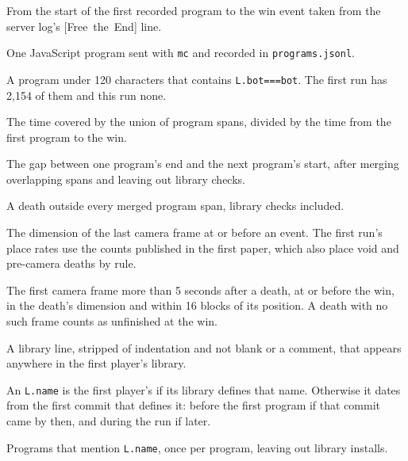 \documentclass[11pt,a4paper]{article}
\newcommand{\adv}[1]{\mbox{\textsf{[#1]}}}
\begin{document}
\begin{description}[leftmargin=0pt,itemsep=3pt,font=\normalfont\bfseries]
  \item[Clock.] From the start of the first recorded program to the win event taken from the server log's \adv{Free the End} line.
  \item[Program.] One JavaScript program sent with \texttt{mc} and recorded in \texttt{programs.jsonl}.
  \item[Library check.] A program under 120 characters that contains \texttt{L.bot===bot}. The first run has 2,154 of them and this run none.
  \item[Running share.] The time covered by the union of program spans, divided by the time from the first program to the win.
  \item[Pause.] The gap between one program's end and the next program's start, after merging overlapping spans and leaving out library checks.
  \item[Death between programs.] A death outside every merged program span, library checks included.
  \item[Place.] The dimension of the last camera frame at or before an event. The first run's place rates use the counts published in the first paper, which also place void and pre-camera deaths by rule.
  \item[Back at the spot.] The first camera frame more than 5 seconds after a death, at or before the win, in the death's dimension and within 16 blocks of its position. A death with no such frame counts as unfinished at the win.
  \item[Line identity.] A library line, stripped of indentation and not blank or a comment, that appears anywhere in the first player's library.
  \item[Origin of a name.] An \texttt{L.name} is the first player's if its library defines that name. Otherwise it dates from the first commit that defines it: before the first program if that commit came by then, and during the run if later.
  \item[Uses of a name.] Programs that mention \texttt{L.name}, once per program, leaving out library installs.
\end{description}
\end{document}

